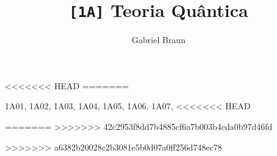 \documentclass[braun, twocolumn]{braun}
\title{\texttt{[1A]} Teoria Quântica}
\affiliation{Colégio e Curso Pensi, Turma IME-ITA}
\author{Gabriel Braun}
\begin{document}
\maketitle[botrule=false]

%                                              
%                                              

<<<<<<< HEAD
=======
\InputDB
{
    1A01, 
    1A02,
    1A03,
    1A04,
    1A05,
    1A06,
    1A07,
<<<<<<< HEAD

=======
>>>>>>> 42c2953f8dd7b4885cf6a7b003b4cda0b97d46fd
}
>>>>>>> a6382b20028c2b3081e5b0d07a0ff256d748ec78





%                                              
%                                              
\end{document}
